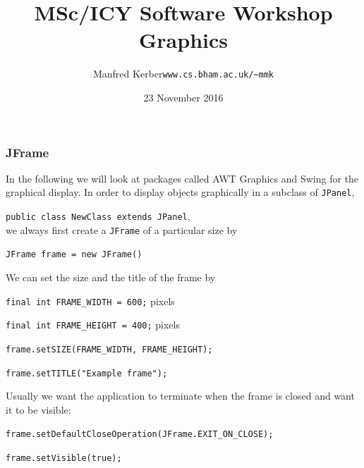 \documentclass{beamer}
\def\mytoday{23 November 2016}
\def\mcolor#1#2{\rule{0ex}{0ex}\color{#1}#2\color{black}{}}
\begin{document}
\title{MSc/ICY Software Workshop\\
Graphics}

\author[Manfred~Kerber]{\begin{tabular}{ll}
\mcolor{blue}{Manfred Kerber} &   {\tt www.cs.bham.ac.uk/\~{}mmk}\\
\end{tabular}}

\date{\mytoday}

\begin{frame}
\titlepage
\end{frame}

\begin{frame}[fragile]
\frametitle{JFrame}

In the following we will look at packages called AWT Graphics and
Swing for the graphical display.  In order to display objects
graphically in a subclass of \texttt{JPanel},\\
\mcolor{blue}{\texttt{public class NewClass extends JPanel}},\\
we always first create a \texttt{JFrame} of a particular size by


\mcolor{blue}{\texttt{JFrame frame = new JFrame()}}\bigskip


We can set the size and the title of the frame by\\

\mcolor{blue}{\texttt{final int FRAME\_WIDTH = 600;}} pixels\\
\mcolor{blue}{\texttt{final int FRAME\_HEIGHT = 400;}} pixels\\
\mcolor{blue}{\texttt{frame.setSIZE(FRAME\_WIDTH, FRAME\_HEIGHT);}}\\
\mcolor{blue}{\texttt{frame.setTITLE("Example frame");}}\\\bigskip


Usually we want the application to terminate when the frame is closed
and want it to be visible:

\mcolor{blue}{\texttt{frame.setDefaultCloseOperation(JFrame.EXIT\_ON\_CLOSE);}}\\
\mcolor{blue}{\texttt{frame.setVisible(true);}}

\end{frame}
\end{document}
